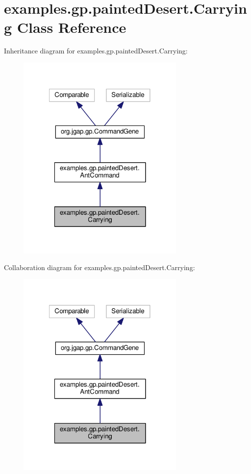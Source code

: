 \hypertarget{classexamples_1_1gp_1_1painted_desert_1_1_carrying}{\section{examples.\-gp.\-painted\-Desert.\-Carrying Class Reference}
\label{classexamples_1_1gp_1_1painted_desert_1_1_carrying}
}


Inheritance diagram for examples.\-gp.\-painted\-Desert.\-Carrying\-:
\nopagebreak
\begin{figure}[H]
\begin{center}
\leavevmode
\includegraphics[width=233pt]{classexamples_1_1gp_1_1painted_desert_1_1_carrying__inherit__graph}
\end{center}
\end{figure}


Collaboration diagram for examples.\-gp.\-painted\-Desert.\-Carrying\-:
\nopagebreak
\begin{figure}[H]
\begin{center}
\leavevmode
\includegraphics[width=233pt]{classexamples_1_1gp_1_1painted_desert_1_1_carrying__coll__graph}
\end{center}
\end{figure}
